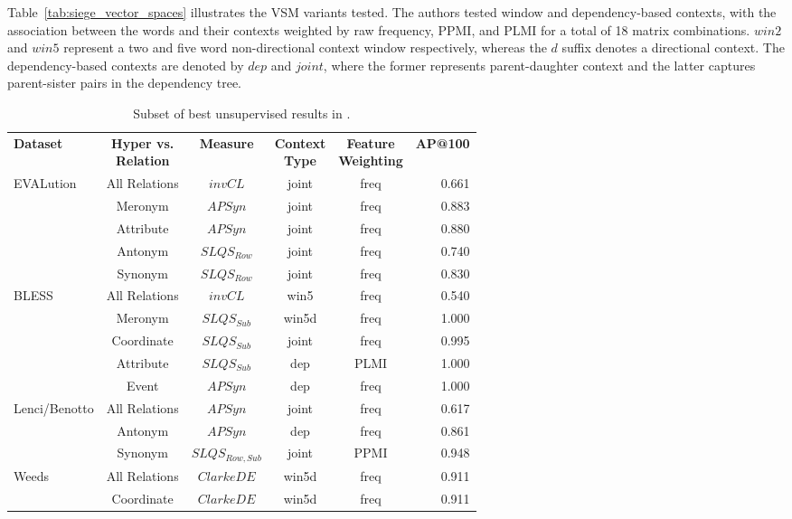 Table~\ref{tab:siege_vector_spaces} illustrates the \ac{VSM} variants tested.  The authors tested window and dependency-based contexts, with the association between the words and their contexts weighted by raw frequency, \ac{PPMI}, and \ac{PLMI} for a total of 18 matrix combinations. $win2$ and $win5$ represent a two and five word non-directional context window respectively, whereas the $d$ suffix denotes a directional context.  The dependency-based contexts are denoted by $dep$ and $joint$, where the former represents parent-daughter context and the latter captures parent-sister pairs in the dependency tree.

\begin{table}\centering
    \begin{tabular}{@{}lccccr@{}} \toprule
    \textbf{Dataset} & \shortstack{\textbf{Hyper vs.} \\ \textbf{Relation} } & \textbf{Measure} & \shortstack{\textbf{Context} \\ \textbf{Type} } & \shortstack{\textbf{Feature} \\ \textbf{Weighting}} & \textbf{AP@100} \\ \cmidrule{1-6}
    \multirow{5}{*}{EVALution} & 
    All Relations & $invCL$ & joint & freq & 0.661 \\
    & Meronym & $APSyn$ & joint & freq & 0.883 \\
    & Attribute & $APSyn$ & joint & freq & 0.880 \\
    & Antonym & $SLQS_{Row}$ & joint & freq & 0.740 \\
    & Synonym & $SLQS_{Row}$ & joint & freq & 0.830 \\
    \cmidrule{1-6}
    \multirow{5}{*}{BLESS} & 
    All Relations & $invCL$ & win5 & freq & 0.540 \\
    & Meronym & $SLQS_{Sub}$ & win5d & freq & 1.000 \\
    & Coordinate & $SLQS_{Sub}$ & joint & freq & 0.995 \\
    & Attribute & $SLQS_{Sub}$ & dep & PLMI & 1.000 \\
    & Event & $APSyn$ & dep & freq & 1.000 \\
    \cmidrule{1-6}
    \multirow{3}{*}{Lenci/Benotto} & 
    All Relations & $APSyn$ & joint & freq & 0.617 \\
    & Antonym & $APSyn$ & dep & freq & 0.861 \\
    & Synonym & $SLQS_{Row, Sub}$ & joint & PPMI & 0.948 \\
    \cmidrule{1-6}
    \multirow{2}{*}{Weeds} & 
    All Relations & $ClarkeDE$ & win5d & freq & 0.911 \\
    & Coordinate & $ClarkeDE$ & win5d & freq & 0.911 \\
    \bottomrule
    \end{tabular}
    \caption{Subset of best unsupervised results in \citep{shwartz2017siege}.}\label{tab:siege_unsupervised_results}
\end{table}

